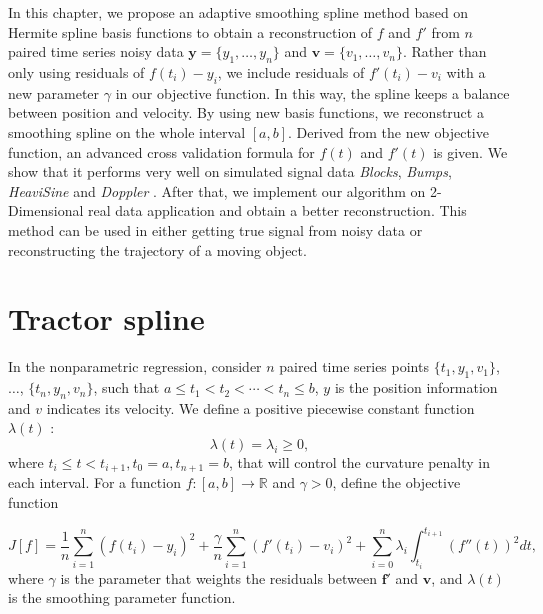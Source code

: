 In this chapter, we propose an adaptive smoothing spline method based on Hermite spline basis functions to obtain a reconstruction of $f$ and $f'$ from $n$ paired time series noisy data $\mathbf{y}=\{y_1,\ldots,y_n\}$ and $\mathbf{v}=\{v_1,\ldots,v_n\}$. Rather than only using residuals of $f(t_i)-y_i$, we include residuals of $f'(t_i)-v_i$ with a new parameter $\gamma$ in our objective function. In this way, the spline keeps a balance between position and velocity. By using new basis functions, we reconstruct a smoothing spline on the whole interval $[a,b]$. Derived from the new objective function, an advanced cross validation formula for $f(t)$ and $f'(t)$ is given. We show that it performs very well on simulated signal data \textit{Blocks}, \textit{Bumps}, \textit{HeaviSine} and \textit{Doppler} \cite{donoho1994ideal}. After that, we implement our algorithm on 2-Dimensional real data application and obtain a better reconstruction. This method can be used in either getting true signal from noisy data or reconstructing the trajectory of a moving object. 


\section{Tractor spline}\label{SectionTractorSpline}


In the nonparametric regression, consider $n$ paired time series points $\{t_1,y_1,v_1\}$, $\ldots$, $\{t_n,y_n,v_n\}$, such that $a \leq t_1<t_2< \cdots < t_n \leq b$, $y$ is the position information and $v$ indicates its velocity. We define a positive piecewise constant function $\lambda(t)$ :
\begin{equation}
\lambda(t) = \lambda_i \geq 0,
\end{equation}
where $t_i \leq t<t_{i+1}, t_0=a, t_{n+1}=b$, that will control the curvature penalty in each interval. For a function $f:[a,b]\rightarrow \mathbb{R}$ and $\gamma>0$, define the objective function 

\begin{equation}\label{tractorsplineObjective}
J[f]= \frac{1}{n} \sum_{i=1}^{n} \left( f(t_i)-y_i \right)^2 + \frac{\gamma}{n} \sum_{i=1}^{n} \left( f'(t_i)-v_i \right)^2 +\sum_{i=0}^{n} \lambda_i\int_{t_i}^{t_{i+1}} \left( f''(t)\right)^2 dt,
\end{equation}
where $\gamma$ is the parameter that weights the residuals between $\mathbf{f}'$ and $\mathbf{v}$, and $\lambda(t)$ is the smoothing parameter function.

